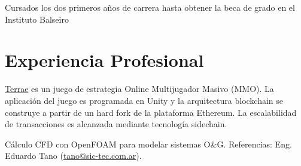 \documentclass[11pt,a4paper,sans]{moderncv}        %
\begin{document}
{Cursados los dos primeros años de carrera hasta obtener la beca de grado en el Instituto Balseiro}




\section{Experiencia Profesional}

{\href{http://terraegame.com/}{Terrae} es un juego de estrategia Online Multijugador Masivo (MMO).
La aplicación del juego es programada en Unity y la arquitectura blockchain se construye a partir de un hard fork de la plataforma Ethereum.
La escalabilidad de transacciones es alcanzada mediante tecnología sidechain.}

{Cálculo CFD con OpenFOAM para modelar sistemas O\&G.\newline{}
Referencias: Eng. Eduardo Tano (\href{mailto:tano@sic-tec.com.ar}{tano@sic-tec.com.ar}).}
\end{document}
